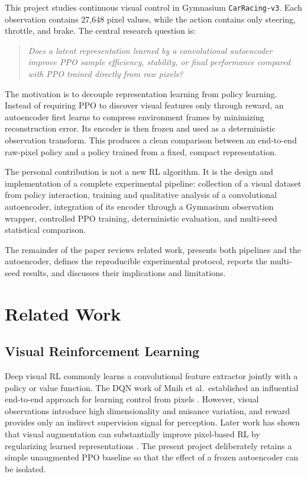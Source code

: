 \documentclass[10pt,twocolumn,a4paper]{article}
\begin{document}
This project studies continuous visual control in Gymnasium
\texttt{CarRacing-v3}. Each observation contains 27,648 pixel values, while the
action contains only steering, throttle, and brake. The central research
question is:

\begin{quote}
\emph{Does a latent representation learned by a convolutional autoencoder
improve PPO sample efficiency, stability, or final performance compared with
PPO trained directly from raw pixels?}
\end{quote}

The motivation is to decouple representation learning from policy learning.
Instead of requiring PPO to discover visual features only through reward, an
autoencoder first learns to compress environment frames by minimizing
reconstruction error. Its encoder is then frozen and used as a deterministic
observation transform. This produces a clean comparison between an end-to-end
raw-pixel policy and a policy trained from a fixed, compact representation.

The personal contribution is not a new RL algorithm. It is the design and
implementation of a complete experimental pipeline: collection of a visual
dataset from policy interaction, training and qualitative analysis of a
convolutional autoencoder, integration of its encoder through a Gymnasium
observation wrapper, controlled PPO training, deterministic evaluation, and
multi-seed statistical comparison.

The remainder of the paper reviews related work, presents both pipelines and the
autoencoder, defines the reproducible experimental protocol, reports the
multi-seed results, and discusses their implications and limitations.

\section{Related Work}

\subsection{Visual Reinforcement Learning}

Deep visual RL commonly learns a convolutional feature extractor jointly with a
policy or value function. The DQN work of Mnih et al.\ established an influential
end-to-end approach for learning control from pixels \cite{mnih2015human}.
However, visual observations introduce high dimensionality and nuisance
variation, and reward provides only an indirect supervision signal for
perception. Later work has shown that visual augmentation can substantially
improve pixel-based RL by regularizing learned representations
\cite{kostrikov2021image}. The present project deliberately retains a simple
unaugmented PPO baseline so that the effect of a frozen autoencoder can be
isolated.
\end{document}
